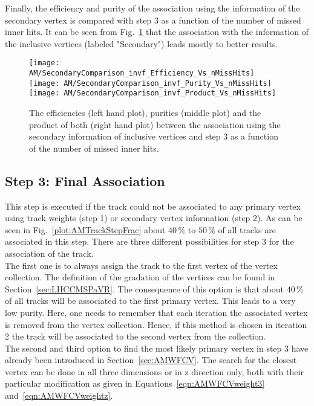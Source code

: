 Finally, the efficiency and purity of the association using the information of the secondary vertex is compared with step 3 as a function of the number of missed inner hits. It can be seen from Fig.~\ref{plot:AMWFSVinvfEffAndPurVsFA} that the association with the information of the inclusive vertices (labeled "Secondary") leads mostly to better results.

\begin{figure}[!ht]
    \centering
    \texttt{[image: AM/SecondaryComparison\_invf\_Efficiency\_Vs\_nMissHits]}
    \texttt{[image: AM/SecondaryComparison\_invf\_Purity\_Vs\_nMissHits]}
    \texttt{[image: AM/SecondaryComparison\_invf\_Product\_Vs\_nMissHits]}
    \caption[Efficiencies, purities and their product of the association using inclusive vertices \vs{} step 3 as a function of missed inner hits]{The efficiencies (left hand plot), purities (middle plot) and the product of both (right hand plot) between the association using the secondary information of inclusive vertices and step 3 as a function of the number of missed inner hits.\label{plot:AMWFSVinvfEffAndPurVsFA}}
\end{figure}


\subsection{Step 3: Final Association\label{sec:AMWFFA}}

This step is executed if the track could not be associated to any primary vertex using track weights (step 1) or secondary vertex information (step 2). As can be seen in Fig.~\ref{plot:AMTrackStepFrac} about $40\,\%$ to $50\,\%$ of all tracks are associated in this step. There are three different possibilities for step 3 for the association of the track. \\
The first one is to always assign the track to the first vertex of the vertex collection. The definition of the gradation of the vertices can be found in Section~\ref{sec:LHCCMSPaVR}. The consequence of this option is that about $40\,\%$ of all tracks will be associated to the first primary vertex. This leads to a very low purity. Here, one needs to remember that each iteration the associated vertex is removed from the vertex collection. Hence, if this method is chosen in iteration 2 the track will be associated to the second vertex from the collection. \\
The second and third option to find the most likely primary vertex in step 3 have already been introduced in Section~\ref{sec:AMWFCV}. The search for the closest vertex can be done in all three dimensions or in z direction only, both with their particular modification as given in Equations~\ref{eqn:AMWFCVweight3} and~\ref{eqn:AMWFCVweightz}.


